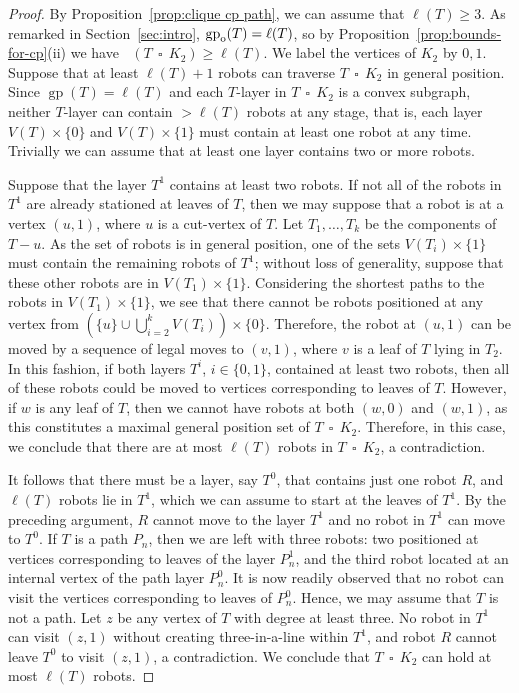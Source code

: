 \documentclass[a4paper,12pt]{article}
\DeclareMathOperator{\mob}{Mob_{gp}}
\DeclareMathOperator{\gp}{gp}
\DeclareMathOperator{\cp}{\,\square\,}
\newcommand{\gpo}{\gp_{\rm o}}
\theoremstyle{definition}
\begin{document}
	\begin{proof}
		By Proposition~\ref{prop:clique cp path}, we can assume that $\ell (T) \geq 3$. As remarked in Section~\ref{sec:intro}, $\gpo(T) = \ell (T)$, so by Proposition~\ref{prop:bounds-for-cp}(ii) we have $\mob (T \cp K_2) \geq \ell (T)$. We label the vertices of $K_2$ by $0,1$. Suppose that at least $\ell (T)+1$ robots can traverse $T \cp K_2$ in general position. Since $\gp (T) = \ell (T)$ and each $T$-layer in $T \cp K_2$ is a convex subgraph, neither $T$-layer can contain $> \ell (T)$ robots at any stage, that is, each layer $V(T) \times \{ 0\} $ and $V(T) \times \{ 1\} $ must contain at least one robot at any time. Trivially we can assume that at least one layer contains two or more robots. 
		
		Suppose that the layer $T^1$ contains at least two robots. If not all of the robots in $T^1$ are already stationed at leaves of $T$, then we may suppose that a robot is at a vertex $(u,1)$, where $u$ is a cut-vertex of $T$. Let $T_1,\dots ,T_k$ be the components of $T-u$. As the set of robots is in general position, one of the sets $V(T_i) \times \{ 1\}$ must contain the remaining robots of $T^1$; without loss of generality, suppose that these other robots are in $V(T_1) \times \{ 1\}$. Considering the shortest paths to the robots in $V(T_1) \times \{ 1\} $, we see that there cannot be robots positioned at any vertex from $(\{ u\} \cup \bigcup _{i=2}^kV(T_i)) \times \{ 0\} $. Therefore, the robot at $(u,1)$ can be moved by a sequence of legal moves to $(v,1)$, where $v$ is a leaf of $T$ lying in $T_2$. In this fashion, if both layers $T^i$, $i \in \{0,1\}$, contained at least two robots, then all of these robots could be moved to vertices corresponding to leaves of $T$. However, if $w$ is any leaf of $T$, then we cannot have robots at both $(w,0)$ and $(w,1)$, as this constitutes a maximal general position set of $T \cp K_2$. Therefore, in this case, we conclude that there are at most $\ell (T)$ robots in $T \cp K_2$, a contradiction. 
		
		It follows that there must be a layer, say $T^0$, that contains just one robot $R$, and $\ell (T)$ robots lie in $T^1$, which we can assume to start at the leaves of $T^1$. By the preceding argument, $R$ cannot move to the layer $T^1$ and no robot in $T^1$ can move to $T^0$. If $T$ is a path $P_n$, then we are left with three robots: two positioned at vertices corresponding to leaves of the layer $P_n^1$, and the third robot located at an internal vertex of the path layer $P_n^0$. It is now readily observed that no robot can visit the vertices corresponding to leaves of $P_n^0$. Hence, we may assume that $T$ is not a path. Let $z$ be any vertex of $T$ with degree at least three. No robot in $T^1$ can visit $(z,1)$ without creating three-in-a-line within $T^1$, and robot $R$ cannot leave $T^0$ to visit $(z,1)$, a contradiction. We conclude that $T \cp K_2$ can hold at most $\ell (T)$ robots.   
	\end{proof}
	
\end{document}
